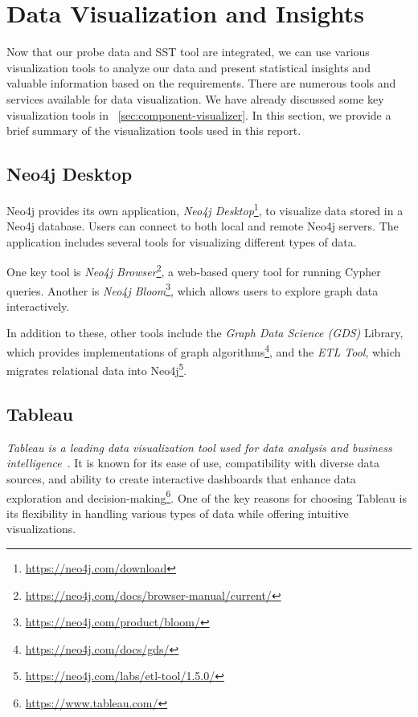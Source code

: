 \section{Data Visualization and Insights}\label{sec:data_visualization}

Now that our probe data and SST tool are integrated, we can use various visualization tools to analyze our data and present statistical insights and valuable information based on the requirements. There are numerous tools and services available for data visualization. We have already discussed some key visualization tools in ~\autoref{sec:component-visualizer}. In this section, we provide a brief summary of the visualization tools used in this report.

\subsection{Neo4j Desktop}
Neo4j provides its own application, \textit{Neo4j Desktop}\footnote{\url{https://neo4j.com/download}}, to visualize data stored in a Neo4j database. Users can connect to both local and remote Neo4j servers. The application includes several tools for visualizing different types of data.

One key tool is \textit{Neo4j Browser}\footnote{\url{https://neo4j.com/docs/browser-manual/current/}}, a web-based query tool for running Cypher queries. Another is \textit{Neo4j Bloom}\footnote{\url{https://neo4j.com/product/bloom/}}, which allows users to explore graph data interactively.

In addition to these, other tools include the \textit{Graph Data Science (GDS)} Library, which provides implementations of graph algorithms\footnote{\url{https://neo4j.com/docs/gds/}}, and the \textit{ETL Tool}, which migrates relational data into Neo4j\footnote{\url{https://neo4j.com/labs/etl-tool/1.5.0/}}.

\subsection{Tableau}
\textit{Tableau is a leading data visualization tool used for data analysis and business intelligence}~\citep{biswal2024visualization}. It is known for its ease of use, compatibility with diverse data sources, and ability to create interactive dashboards that enhance data exploration and decision-making\footnote{\url{https://www.tableau.com/}}. One of the key reasons for choosing Tableau is its flexibility in handling various types of data while offering intuitive visualizations.

